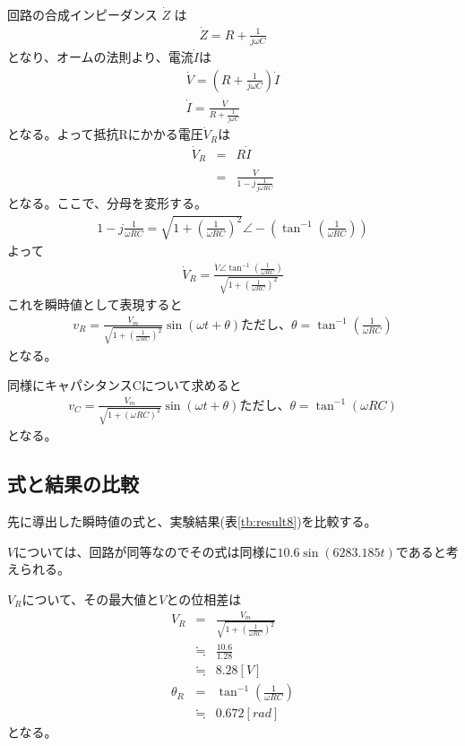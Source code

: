 \documentclass[dvipdfmx]{jsarticle}
\begin{document}
回路の合成インピーダンス $\dot Z$ は
\begin{eqnarray*}
    \dot Z = R + \frac{1}{j\omega C}
\end{eqnarray*}
となり、オームの法則より、電流$\dot I$は
\begin{eqnarray*}
    \dot V = (R + \frac{1}{j\omega C})\dot I\\
    \dot I = \frac{\dot V}{R + \frac{1}{j\omega C}}
\end{eqnarray*}
となる。よって抵抗Rにかかる電圧$\dot V_R$は
\begin{eqnarray*}
  \dot V_R & = & R \dot I\\
  & = & \frac{\dot V}{1 - j\frac{1}{j\omega RC}}
\end{eqnarray*}
となる。ここで、分母を変形する。
\begin{eqnarray*}
  1- j\frac{1}{\omega RC} = \sqrt{1 + (\frac{1}{\omega RC})^2}\angle -(\tan^{-1}(\frac{1}{\omega RC}))
\end{eqnarray*}
よって
\begin{eqnarray*}
  \dot V_R = \frac{\dot V \angle \tan^{-1}(\frac{1}{\omega RC})}{\sqrt{1 + (\frac{1}{\omega RC})^2}}
\end{eqnarray*}
これを瞬時値として表現すると
\begin{eqnarray*}
  v_R = \frac{V_m}{\sqrt{1 + (\frac{1}{\omega RC})^2}} \sin(\omega t + \theta) ただし、\theta = \tan^{-1}(\frac{1}{\omega RC})
\end{eqnarray*}
となる。

同様にキャパシタンスCについて求めると
\begin{eqnarray*}
  v_C = \frac{V_m}{\sqrt{1 + (\omega RC)^2}}\sin(\omega t + \theta) ただし、\theta = \tan^{-1}(\omega RC)
\end{eqnarray*}
となる。

\subsection{式と結果の比較}
先に導出した瞬時値の式と、実験結果(表\ref{tb:result8})を比較する。

$V$については、回路が同等なのでその式は同様に$10.6\sin(6283.185t)$であると考えられる。

$V_R$について、その最大値と$V$との位相差は
\begin{eqnarray*}
  V_R & = & \frac{V_m}{\sqrt{1 + (\frac{1}{\omega RC})^2}}\\
  & \fallingdotseq & \frac{10.6}{1.28}\\
  & \fallingdotseq & 8.28 [V]\\
  \theta_R & = &\tan^{-1}(\frac{1}{\omega RC})\\
  & \fallingdotseq & 0.672 [rad]
\end{eqnarray*}
となる。
\end{document}
